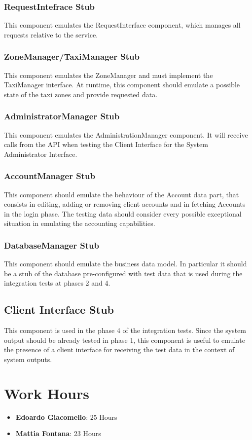 \documentclass[11pt, a4paper,titlepage]{article}
\begin{document}
			\subsubsection{RequestIntefrace Stub}
			This component emulates the RequestInterface component, which manages all requests relative to the service. 
			\subsubsection{ZoneManager/TaxiManager Stub}
			This component emulates the ZoneManager and must implement the TaxiManager interface. At runtime, this component should emulate a possible state of the taxi zones and provide requested data. 
			\subsubsection{AdministratorManager Stub}
			This component emulates the AdministrationManager component. It will receive calls from the API when testing the Client Interface for the System Administrator Interface. 
			\subsubsection{AccountManager Stub}
			This component should emulate the behaviour of the Account data part, that consists in editing, adding or removing client accounts and in fetching Accounts in the login phase. The testing data should consider every possible exceptional situation in emulating the accounting capabilities.
			\subsubsection{DatabaseManager Stub}
			This component should emulate the business data model. In particular it should be a stub of the database pre-configured with test data that is used during the integration tests at phases 2 and 4.
			\subsection{Client Interface Stub}
			This component is used in the phase 4 of the integration tests. Since the system output should be already tested in phase 1, this component is useful to emulate the presence of a client interface for receiving the test data in the context of system outputs.
	\section{Work Hours}
		\begin{itemize}
			\item \textbf{Edoardo Giacomello}: 25 Hours
			\item \textbf{Mattia Fontana}: 23 Hours
		\end{itemize}	
\end{document}
